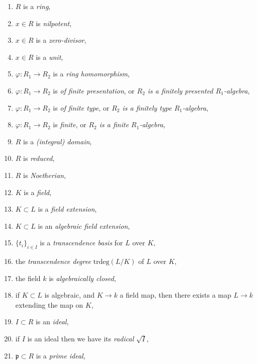 \begin{enumerate}
\item $R$ is a {\it ring},
\label{ring}
\item $x\in R$ is {\it nilpotent},
\label{ring-element-nilpotent}
\item $x\in R$ is a {\it zero-divisor},
\label{ring-element-zerodivisor}
\item $x\in R$ is a {\it unit},
\label{ring-element-unit}
\item $\varphi : R_1 \to R_2$ is a {\it ring homomorphism},
\label{ring-homomorphism}
\item $\varphi : R_1 \to R_2$ is {\it of finite presentation}, or
{\it $R_2$ is a finitely presented $R_1$-algebra},
\label{ring-homomorphism-finite-presentation}
\item $\varphi : R_1 \to R_2$ is {\it of finite type}, or
{\it $R_2$ is a finitely type $R_1$-algebra},
\label{ring-homomorphism-finite-type}
\item $\varphi : R_1 \to R_2$ is {\it finite}, or
{\it $R_2$ is a finite $R_1$-algebra},
\label{ring-homomorphism-finite}
\item $R$ is a {\it (integral) domain},
\label{ring-domain}
\item $R$ is {\it reduced},
\label{ring-reduced}
\item $R$ is {\it Noetherian},
\label{ring-Noetherian}
\item $K$ is a {\it field},
\label{field}
\item $K \subset L$ is a {\it field extension},
\label{field-extension}
\item $K \subset L$ is an {\it algebraic field extension},
\label{field-extension-algebraic}
\item $\{t_i\}_{i\in I}$ is a {\it transcendence basis} for $L$ over $K$,
\label{transcendence-basis}
\item the {\it transcendence degree} $\text{trdeg}(L/K)$ of $L$
over $K$,
\label{transcendence-degree}
\item the field $k$ is {\it algebraically closed},
\label{algebraically-closed}
\item if $K \subset L$ is algebraic, and $K \to k$ a field map,
then there exists a map $L \to k$ extending the map on $K$,
\label{extend-into-algebraically-closed}
\item $I \subset R$ is an {\it ideal},
\label{ideal}
\item if $I$ is an ideal then we have its {\it radical} $\sqrt{I}$,
\label{radical-ideal}
\item $\mathfrak p \subset R$ is a {\it prime ideal},

\end{enumerate}

